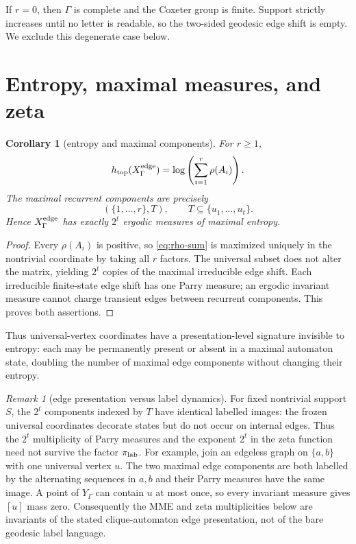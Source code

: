 \documentclass[11pt,a4paper]{amsart}
\newtheorem{corollary}[theorem]{Corollary}
\theoremstyle{definition}
\theoremstyle{remark}
\newtheorem{remark}[theorem]{Remark}
\begin{document}
If $r=0$, then $\Gamma$ is complete and the Coxeter group is finite.  Support
strictly increases until no letter is readable, so the two-sided geodesic
edge shift is empty.  We exclude this degenerate case below.

\section{Entropy, maximal measures, and zeta}

\begin{corollary}[entropy and maximal components]\label{cor:entropy}
For $r\geq1$,
\begin{equation}\label{eq:entropy}
 h_{\rm top}(X_\Gamma^{\rm edge})=
 \log\left(\sum_{i=1}^r\rho(A_i)\right).
\end{equation}
The maximal recurrent components are precisely
\[
 (\{1,\ldots,r\},T),\qquad T\subseteq\{u_1,\ldots,u_t\}.
\]
Hence $X_\Gamma^{\rm edge}$ has exactly $2^t$ ergodic measures of maximal
entropy.
\end{corollary}

\begin{proof}
Every $\rho(A_i)$ is positive, so \eqref{eq:rho-sum} is maximized uniquely in
the nontrivial coordinate by taking all $r$ factors.  The universal subset
does not alter the matrix, yielding $2^t$ copies of the maximal irreducible
edge shift.  Each irreducible finite-state edge shift has one Parry measure;
an ergodic invariant measure cannot charge transient edges between recurrent
components.  This proves both assertions.
\end{proof}

Thus universal-vertex coordinates have a presentation-level signature
invisible to entropy: each may be permanently present or absent in a maximal
automaton state, doubling the number of maximal edge components without
changing their entropy.

\begin{remark}[edge presentation versus label dynamics]\label{rem:labels}
For fixed nontrivial support $S$, the $2^t$ components indexed by $T$ have
identical labelled images: the frozen universal coordinates decorate states
but do not occur on internal edges.  Thus the $2^t$ multiplicity of Parry
measures and the exponent $2^t$ in the zeta function need not survive the
factor $\pi_{\rm lab}$.  For example, join an edgeless graph on
$\{a,b\}$ with one universal vertex $u$.  The two maximal edge components are
both labelled by the alternating sequences in $a,b$ and their Parry measures
have the same image.  A point of $Y_\Gamma$ can contain $u$ at most once, so
every invariant measure gives $[u]$ mass zero.  Consequently the MME and zeta
multiplicities below are invariants of the stated clique-automaton edge
presentation, not of the bare geodesic label language.
\end{remark}
\end{document}
